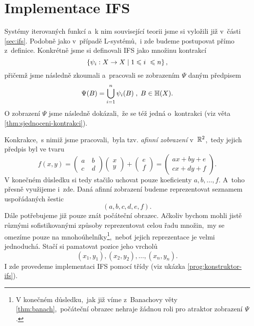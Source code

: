 \section{Implementace IFS}\label{sec:implementace-ifs}

Systémy iterovaných funkcí a~k nim související teorii jsme si vyložili již v~části \ref{sec:ifs}. Podobně jako v~případě L-systémů,~i zde budeme postupovat přímo z~definice. Konkrétně jsme si definovali IFS jako množinu kontrakcí
\[\left\{\psi_i:X \rightarrow X\mid 1\leqslant i~\leqslant n\right\},\]
přičemž jsme následně zkoumali a~pracovali se zobrazením $\Psi$ daným předpisem
\[\Psi(B)=\bigcup_{i=1}^n\psi_i(B)\;,\;B\in\mathbb{H}(X).\]
O zobrazení $\Psi$ jsme následně dokázali,~že se též jedná o~kontrakci (viz věta \ref{thm:sjednoceni-kontrakci}).

Konkrakce,~s nimiž jsme pracovali,~byla tzv. \emph{afinní zobrazení} v~$\mathbb{R}^2$,~tedy jejich předpis byl ve tvaru
\begin{equation}\label{eq:afinni-zobrazeni}
    f(x,y)=\left(\begin{matrix}
        a~& b\\
        c & d
    \end{matrix}\right)\left(\begin{matrix}
        x\\
        y
    \end{matrix}\right)+\left(\begin{matrix}
        e\\
        f
    \end{matrix}\right)=\left(\begin{matrix}
        ax+by+e\\
        cx+dy+f
    \end{matrix}\right).
\end{equation}
V konečném důsledku si tedy stačilo uchovat pouze koeficienty $a,b,\ldots,f$. A~toho přesně využijeme i~zde. Daná afinní zobrazení budeme reprezentovat seznamem uspořádaných šestic
\[(a,b,c,d,e,f).\]
Dále potřebujeme již pouze znát počáteční obrazec. Ačkoliv bychom mohli jistě různými sofistikovanými způsoby reprezentovat celou řadu množin,~my se omezíme pouze na mnohoúhelníky\footnote{V konečném důsledku,~jak již víme z~Banachovy věty \ref{thm:banach},~počáteční obrazec nehraje žádnou roli pro atraktor zobrazení $\Psi$.},~neboť jejich reprezentace je velmi jednoduchá. Stačí si pamatovat pozice jeho vrcholů
\[(x_1,y_1),(x_2,y_2),\ldots,(x_n,y_n).\]
I zde provedeme implementaci IFS pomocí třídy (viz ukázka \ref{prog:konstruktor-ifs}).
